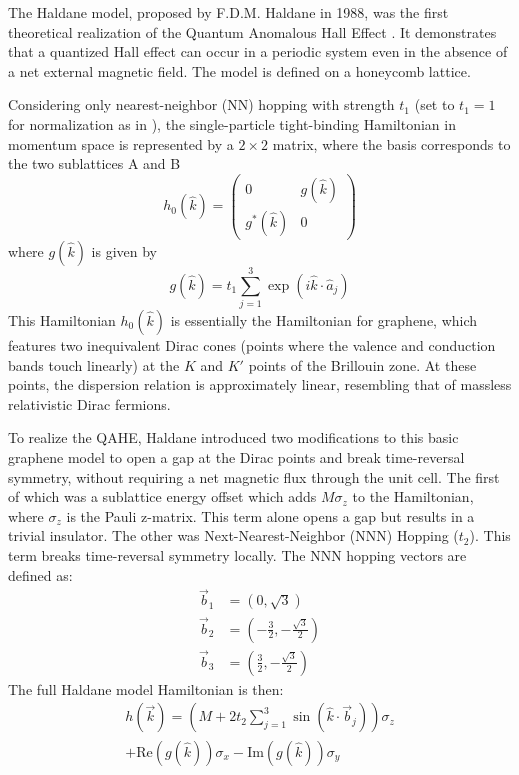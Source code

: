 \documentclass[aps,prb,twocolumn]{revtex4-2}
\begin{document}
      The Haldane model, proposed by F.D.M. Haldane in 1988, was the first theoretical realization of the Quantum Anomalous Hall Effect \cite{LectureNotesChapter3}. It demonstrates that a quantized Hall effect can occur in a periodic system even in the absence of a net external magnetic field. The model is defined on a honeycomb lattice.
      
      Considering only nearest-neighbor (NN) hopping with strength $t_1$ (set to $t_1=1$ for normalization as in ), the single-particle tight-binding Hamiltonian in momentum space is represented by a $2 \times 2$ matrix, where the basis corresponds to the two sublattices A and B
      \[ h_0(\hat{k}) = \begin{pmatrix} 0 & g(\hat{k}) \\ g^*(\hat{k}) & 0 \end{pmatrix} \]
      where $g(\hat{k})$ is given by
      \[ g(\hat{k}) = t_1 \sum_{j=1}^{3} \exp(i \hat{k} \cdot \hat{a}_j) \]
      This Hamiltonian $h_0(\hat{k})$ is essentially the Hamiltonian for graphene, which features two inequivalent Dirac cones (points where the valence and conduction bands touch linearly) at the $K$ and $K'$ points of the Brillouin zone. At these points, the dispersion relation is approximately linear, resembling that of massless relativistic Dirac fermions.
      
      To realize the QAHE, Haldane introduced two modifications to this basic graphene model to open a gap at the Dirac points and break time-reversal symmetry, without requiring a net magnetic flux through the unit cell. The first of which was a sublattice energy offset which adds $M\sigma_z$ to the Hamiltonian, where $\sigma_z$ is the Pauli z-matrix. This term alone opens a gap but results in a trivial insulator. The other was Next-Nearest-Neighbor (NNN) Hopping ($t_2$). This term breaks time-reversal symmetry locally. The NNN hopping vectors are defined as:
          \begin{align*}
              \vec{b}_1 &= (0, \sqrt{3}) \\ %
              \vec{b}_2 &= \left(-\frac{3}{2}, -\frac{\sqrt{3}}{2}\right) \\ %
              \vec{b}_3 &= \left(\frac{3}{2}, -\frac{\sqrt{3}}{2}\right) %
          \end{align*}
      The full Haldane model Hamiltonian is then:
      \begin{multline}
        h(\vec{k}) = \left( M + 2t_2 \sum_{j=1}^{3} \sin(\hat{k} \cdot \vec{b}_j) \right) \sigma_z \\
        + \text{Re}(g(\hat{k}))\sigma_x - \text{Im}(g(\hat{k}))\sigma_y
      \end{multline}
      
\end{document}
